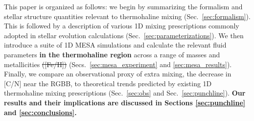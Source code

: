 This paper is organized as follows: we begin by summarizing the formalism and stellar structure quantities relevant to thermohaline mixing (Sec.~\ref{sec:formalism}). This is followed by a description of various 1D mixing prescriptions commonly adopted in stellar evolution calculations (Sec.~\ref{sec:parameterizations}). %
We then introduce a suite of 1D MESA simulations and calculate the relevant fluid parameters \textbf{in the thermohaline region}
across a range of masses and metallicities \sout{([Fe/H]) } (Secs.~\ref{sec:mesa_experiment} and \ref{sec:mesa_results}). 
Finally, we compare an observational proxy of extra mixing, the decrease in [C/N] near the RGBB, to theoretical trends predicted by existing 1D thermohaline mixing prescriptions (Sec.~\ref{sec:obs} and Sec.~\ref{sec:punchline}). \textbf{Our results and their implications are discussed in Sections \ref{sec:punchline} and \ref{sec:conclusions}.} 
